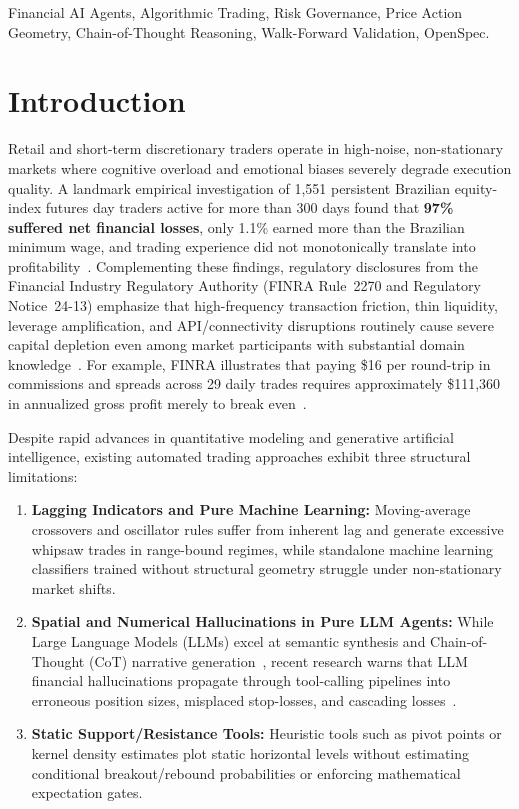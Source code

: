 \documentclass[conference]{IEEEtran}
\begin{document}
\begin{IEEEkeywords}
Financial AI Agents, Algorithmic Trading, Risk Governance, Price Action Geometry, Chain-of-Thought Reasoning, Walk-Forward Validation, OpenSpec.
\end{IEEEkeywords}

\section{Introduction}
Retail and short-term discretionary traders operate in high-noise, non-stationary markets where cognitive overload and emotional biases severely degrade execution quality. A landmark empirical investigation of 1,551 persistent Brazilian equity-index futures day traders active for more than 300 days found that \textbf{97\% suffered net financial losses}, only 1.1\% earned more than the Brazilian minimum wage, and trading experience did not monotonically translate into profitability~\cite{chague2019day}. Complementing these findings, regulatory disclosures from the Financial Industry Regulatory Authority (FINRA Rule~2270 and Regulatory Notice~24-13) emphasize that high-frequency transaction friction, thin liquidity, leverage amplification, and API/connectivity disruptions routinely cause severe capital depletion even among market participants with substantial domain knowledge~\cite{finra2270,finra2413}. For example, FINRA illustrates that paying \$16 per round-trip in commissions and spreads across 29 daily trades requires approximately \$111,360 in annualized gross profit merely to break even~\cite{finra2270}.

Despite rapid advances in quantitative modeling and generative artificial intelligence, existing automated trading approaches exhibit three structural limitations:
\begin{enumerate}
    \item \textbf{Lagging Indicators and Pure Machine Learning:} Moving-average crossovers and oscillator rules suffer from inherent lag and generate excessive whipsaw trades in range-bound regimes, while standalone machine learning classifiers trained without structural geometry struggle under non-stationary market shifts.
    \item \textbf{Spatial and Numerical Hallucinations in Pure LLM Agents:} While Large Language Models (LLMs) excel at semantic synthesis and Chain-of-Thought (CoT) narrative generation~\cite{wei2022chainofthought}, recent research warns that LLM financial hallucinations propagate through tool-calling pipelines into erroneous position sizes, misplaced stop-losses, and cascading losses~\cite{xia2026agentic}.
    \item \textbf{Static Support/Resistance Tools:} Heuristic tools such as pivot points or kernel density estimates plot static horizontal levels without estimating conditional breakout/rebound probabilities or enforcing mathematical expectation gates.
\end{enumerate}
\end{document}
